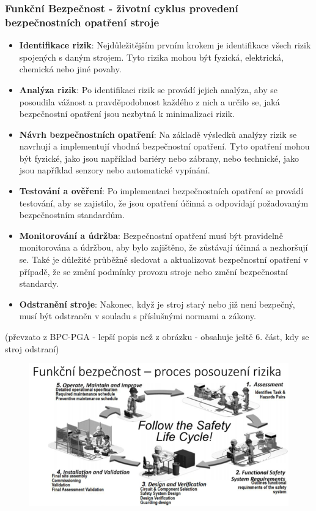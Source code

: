 \subsubsection*{Funkční Bezpečnost - životní cyklus provedení bezpečnostních opatření stroje}
\begin{itemize}
  \item \textbf{Identifikace rizik}: Nejdůležitějším prvním krokem je identifikace všech rizik spojených s daným strojem. Tyto rizika mohou být fyzická, elektrická, chemická nebo jiné povahy.
  \item \textbf{Analýza rizik}: Po identifikaci rizik se provádí jejich analýza, aby se posoudila vážnost a pravděpodobnost každého z nich a určilo se, jaká bezpečnostní opatření jsou nezbytná k minimalizaci rizik.
  \item \textbf{Návrh bezpečnostních opatření}: Na základě výsledků analýzy rizik se navrhují a implementují vhodná bezpečnostní opatření. Tyto opatření mohou být fyzické, jako jsou například bariéry nebo zábrany, nebo technické, jako jsou například senzory nebo automatické vypínání.
  \item \textbf{Testování a ověření}: Po implementaci bezpečnostních opatření se provádí testování, aby se zajistilo, že jsou opatření účinná a odpovídají požadovaným bezpečnostním standardům.
  \item \textbf{Monitorování a údržba}: Bezpečnostní opatření musí být pravidelně monitorována a údržbou, aby bylo zajištěno, že zůstávají účinná a nezhoršují se. Také je důležité průběžně sledovat a aktualizovat bezpečnostní opatření v případě, že se změní podmínky provozu stroje nebo změní bezpečnostní standardy.
  \item \textbf{Odstranění stroje}: Nakonec, když je stroj starý nebo již není bezpečný, musí být odstraněn v souladu s příslušnými normami a zákony.
\end{itemize}
(převzato z BPC-PGA - lepší popis než z obrázku - obsahuje ještě 6. část, kdy se stroj odstraní)

\begin{figure}[h]
  \begin{center}
    \includegraphics[scale = 1]{img/Picture21.png}
  \end{center}
\end{figure}

